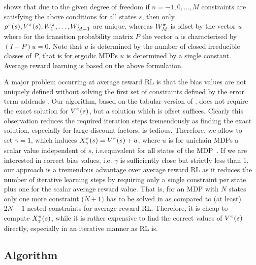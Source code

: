 \documentclass[envcountsame]{llncs}
\begin{document}
\citet[p.343ff]{Puterman94} shows that due to the given degree of freedom if \(n=-1,0,\ldots,M\)
constraints are satisfying the above conditions for all states \(s\), then only
\(\rho^{\pi}(s), V^{\pi}(s), W^{\pi}_{1}, \ldots, W^{\pi}_{M-1}\) are unique, whereas
\(W^{\pi}_{M}\) is offset by the vector \(u\) where for the transition probability matrix \(P\) the
vector \(u\) is characterised by \((I-P)u = 0\). Note that \(u\) is determined by the number of
closed irreducible classes of \(P\), that is for ergodic MDPs \(u\) is determined by a single
constant. Average reward learning is based on the above formulation.


A major problem occurring at average reward RL is that the bias values are not uniquely defined
without solving the first set of constraints defined by the error term addends
\citep[see][p.346]{Puterman94,Mahadevan96_SensitiveDiscountOptimalityUnifyingDiscountedAndAverageRewardReinforcementLearning}.
%
Our algorithm, based on the tabular version of \citet{schneckenreither2020average}, does not require
the exact solution for \(V^{\pi}(s)\), but a solution which is offset suffices. Clearly this
observation reduces the required iteration steps tremendously as finding the exact solution,
especially for large discount factors, is tedious. Therefore, we allow to set \(\gamma = 1\), which
induces \(X_{\gamma}^{\pi}(s) = V^{\pi}(s) + u\), where \(u\) is for unichain MDPs a scalar value
independent of \(s\), i.e.\@ equivalent for all states of the MDP~\cite[p.346]{Puterman94}.
%
%
If we are interested in correct bias values, i.e. \(\gamma\) is sufficiently close but strictly less
than \(1\), our approach is a tremendous advantage over average reward RL as it reduces the number
of iterative learning steps by requiring only a single constraint per state plus one for the scalar
average reward value. That is, for an MDP with \(N\) states only one more constraint (\(N+1)\) has
to be solved in \ARA{} as compared to (at least) \(2N+1\) nested constraints for average reward RL.
Therefore, it is cheap to compute \(X_{\gamma}^{\pi}(s)\), while it is rather expensive to find
the correct values of \(V^{\pi}(s)\) directly, especially in an iterative manner as RL is.


\subsection{Algorithm}
\label{subsec:Algorithm}
\end{document}
